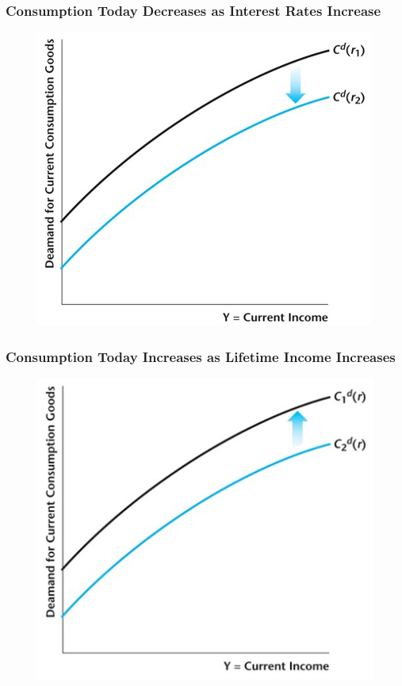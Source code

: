 \documentclass{beamer}
\begin{document}
\begin{frame}
\frametitle[alignment=center]{Consumption Today Decreases as Interest Rates Increase}
\begin{figure}
\centering
\includegraphics[scale=0.6]{Figures/W_Fig_11pt5.png}
\end{figure}
\end{frame}

\begin{frame}
\frametitle[alignment=center]{Consumption Today Increases as Lifetime Income Increases}
\begin{figure}
\centering
\includegraphics[scale=0.6]{Figures/W_Fig_11pt6.png}
\end{figure}
\end{frame}
\end{document}
